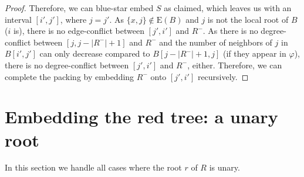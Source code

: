 \documentclass[11pt,a4paper,colorlinks=true,urlcolor=blue,citecolor=red]{article}
\theoremstyle{plain}
\newcommand{\EB}{\mathrm{E}(B)}
\begin{document}
\begin{proof}
  Therefore, we can blue-star embed $S$ as claimed, which
leaves us with an interval $[i',j']$, where $j=j'$. As
  $\{x,j\}\notin\EB$ and $j$ is not the local root of $B$ ($i$ is),
  there is no edge-conflict between $[j',i']$ and $R^-$. As there is no
  degree-conflict between $[j,j-|R^-|+1]$ and $R^-$ and the number of
  neighbors of $j$ in $B[i',j']$ can only decrease compared to
  $B[j-|R^-|+1,j]$ (if they appear in $\varphi$), there is no
  degree-conflict between $[j',i']$ and $R^-$, either. Therefore, we can
  complete the packing by embedding $R^-$ onto $[j',i']$ recursively.
\end{proof}
















\section{Embedding the red tree: a unary root}\label{subsec:rec_unary}

In this section we handle all cases where the root $r$ of $R$ is unary.
\end{document}
